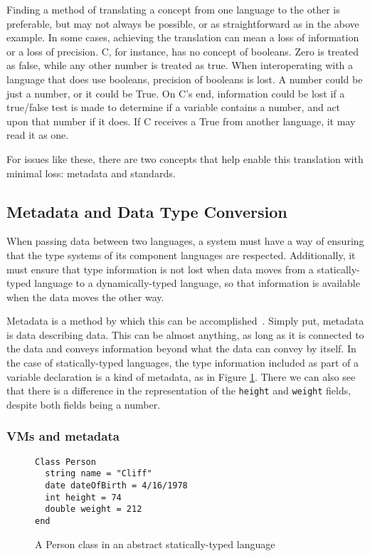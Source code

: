 \documentclass{sig-alternate}
\begin{document}
Finding a method of translating a concept from one language to the other is preferable, but may not always be possible, or as straightforward as in the above example. In some cases, achieving the translation can mean a loss of information or a loss of precision. C, for instance, has no concept of booleans. Zero is treated as false, while any other number is treated as true. When interoperating with a language that does use booleans, precision of booleans is lost. A number could be just a number, or it could be True. On C's end, information could be lost if a true/false test is made to determine if a variable contains a number, and act upon that number if it does. If C receives a True from another language, it may read it as one.

For issues like these, there are two concepts that help enable this translation with minimal loss: metadata and standards.
\subsection{Metadata and Data Type Conversion}\label{metadata}
When passing data between two languages, a system must have a way of ensuring that the type systems of its component languages are respected. Additionally, it must ensure that type information is not lost when data moves from a statically-typed language to a dynamically-typed language, so that information is available when the data moves the other way.

Metadata is a method by which this can be accomplished~\cite{Ide:2010}. Simply put, metadata is data describing data.
This can be almost anything, as long as it is connected to the data and conveys information beyond what the data can convey by itself. In the case of statically-typed languages, the type information included as part of a variable declaration is a kind of metadata, as in Figure \ref{typedExample}. There we can also see that there is a difference in the representation of the {\tt height} and {\tt weight} fields, despite both fields being a number.


\subsubsection*{VMs and metadata}

\begin{figure}
\begin{verbatim}
Class Person
  string name = "Cliff"
  date dateOfBirth = 4/16/1978
  int height = 74
  double weight = 212
end
\end{verbatim}
\caption{A Person class in an abstract statically-typed language}
\label{typedExample}
\end{figure}
\end{document}
